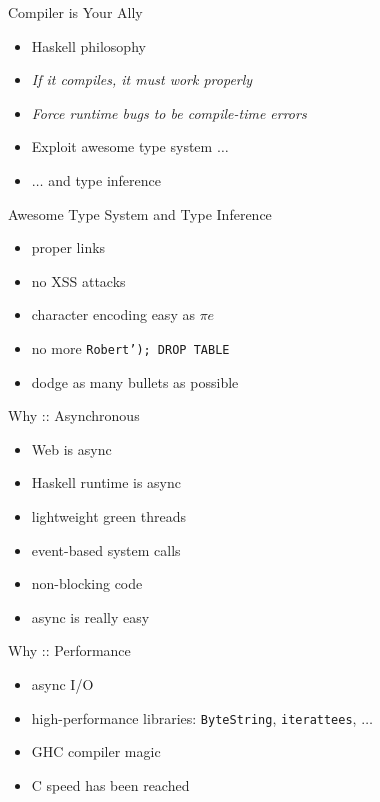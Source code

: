 \documentclass{beamer}
\begin{document}
\begin{frame}{Compiler is Your Ally}
  \begin{itemize}[<+->]
    \item Haskell philosophy
    \item \textit{If it compiles, it must work properly}
    \item \textit{Force runtime bugs to be compile-time errors}
    \item Exploit awesome type system $\ldots$
    \item $\ldots$ and type inference
  \end{itemize}
\end{frame}

\begin{frame}{Awesome Type System and Type Inference}
  \begin{itemize}[<+->]
    \item proper links
    \item no XSS attacks
    \item character encoding easy as $\pi e$
    \item no more \texttt{Robert'); DROP TABLE}
    \item dodge as many bullets as possible
  \end{itemize}
\end{frame}

\begin{frame}{Why :: Asynchronous}
  \begin{itemize}[<+->]
    \item Web is async
    \item Haskell runtime is async
    \item lightweight green threads
    \item event-based system calls
    \item non-blocking code
    \item async is really easy
  \end{itemize}
\end{frame}

\begin{frame}{Why :: Performance}
  \begin{center}\end{center}
  \begin{itemize}[<+->]
    \item async I/O
    \item high-performance libraries: \texttt{ByteString},
    \texttt{iterattees}, $\ldots$
    \item GHC compiler magic
    \item C speed has been reached
  \end{itemize}
\end{frame}
\end{document}
